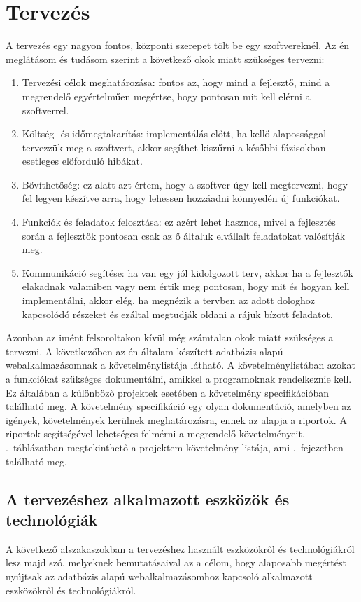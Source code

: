 \documentclass[]{thesis-ekf}
\theoremstyle{definition}
\theoremstyle{remark}
\begin{document}
	\chapter{Tervezés}
		A tervezés egy nagyon fontos, központi szerepet tölt be egy szoftvereknél. Az én meglátásom és tudásom szerint a következő okok miatt szükséges tervezni:
		\begin{enumerate}
			\item Tervezési célok meghatározása: fontos az, hogy mind a fejlesztő, mind a megrendelő egyértelműen megértse, hogy pontosan mit kell elérni a szoftverrel.
			\item Költség- és időmegtakarítás: implementálás előtt, ha kellő alapossággal tervezzük meg a szoftvert, akkor segíthet kiszűrni a későbbi fázisokban esetleges előforduló hibákat. 
			\item Bővíthetőség: ez alatt azt értem, hogy a szoftver úgy kell megtervezni, hogy fel legyen készítve arra, hogy lehessen hozzáadni könnyedén új funkciókat.
			\item Funkciók és feladatok felosztása: ez azért lehet hasznos, mivel a fejlesztés során a fejlesztők pontosan csak az ő általuk elvállalt feladatokat valósítják meg.
			\item Kommunikáció segítése: ha van egy jól kidolgozott terv, akkor ha a fejlesztők elakadnak valamiben vagy nem értik meg pontosan, hogy mit és hogyan kell implementálni, akkor elég, ha megnézik a tervben az adott dologhoz kapcsolódó részeket és ezáltal megtudják oldani a rájuk bízott feladatot.
		\end{enumerate}
		Azonban az imént felsoroltakon kívül még számtalan okok miatt szükséges a tervezni. A következőben az én általam készített adatbázis alapú webalkalmazásomnak a követelménylistája látható. A követelménylistában azokat a funkciókat szükséges dokumentálni, amikkel a programoknak rendelkeznie kell. Ez általában a különböző projektek esetében a követelmény specifikációban található meg. A követelmény specifikáció egy olyan dokumentáció, amelyben az igények, követelmények kerülnek meghatározásra, ennek az alapja a riportok. A riportok segítségével lehetséges felmérni a megrendelő követelményeit. .~táblázatban megtekinthető a projektem követelmény listája, ami .~fejezetben található meg.
		
	\section{A tervezéshez alkalmazott eszközök és technológiák}
		A következő alszakaszokban a tervezéshez használt eszközökről és technológiákról lesz majd szó, melyeknek bemutatásaival az a célom, hogy alaposabb megértést nyújtsak az adatbázis alapú webalkalmazásomhoz kapcsoló alkalmazott eszközökről és technológiákról.
\end{document}
